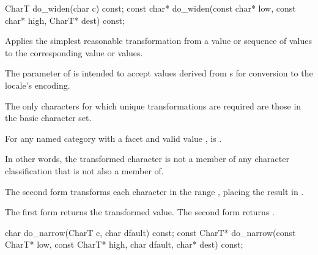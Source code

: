 %
\begin{itemdecl}
CharT        do_widen(char c) const;
const char*  do_widen(const char* low, const char* high, CharT* dest) const;
\end{itemdecl}

\begin{itemdescr}
\pnum
\effects
Applies the simplest reasonable transformation
from a  value or sequence of  values
to the corresponding  value or values.
\begin{footnote}
The parameter  of  is intended to
accept values derived from s
for conversion to the locale's encoding.
\end{footnote}
The only characters for which unique transformations are required
are those in the basic character set.

For any named  category with
a  facet  and
valid  value ,
 is .
\begin{footnote}
In other words, the transformed character is not
a member of any character classification
that  is not also a member of.
\end{footnote}

The second form transforms
each character  in the range ,
placing the result in .

\pnum
\returns
The first form returns the transformed value.
The second form returns .
\end{itemdescr}

%
\begin{itemdecl}
char         do_narrow(CharT c, char dfault) const;
const CharT* do_narrow(const CharT* low, const CharT* high, char dfault, char* dest) const;
\end{itemdecl}

